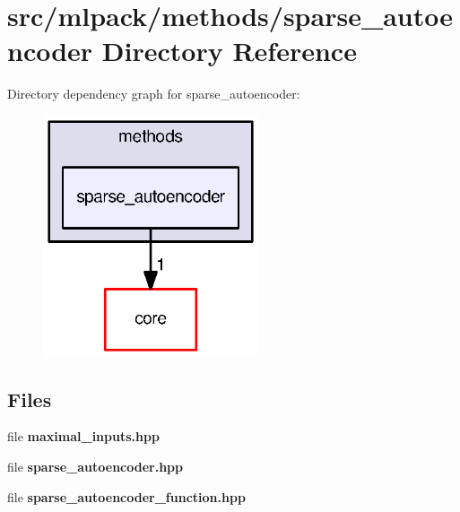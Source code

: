 \section{src/mlpack/methods/sparse\+\_\+autoencoder Directory Reference}
\label{dir_26bd3aa1fbc5e44d8d68d3fa31d9d0ed}
Directory dependency graph for sparse\+\_\+autoencoder\+:
\nopagebreak
\begin{figure}[H]
\begin{center}
\leavevmode
\includegraphics[width=180pt]{dir_26bd3aa1fbc5e44d8d68d3fa31d9d0ed_dep}
\end{center}
\end{figure}
\subsection*{Files}
\begin{DoxyCompactItemize}
\item 
file {\bf maximal\+\_\+inputs.\+hpp}
\item 
file {\bf sparse\+\_\+autoencoder.\+hpp}
\item 
file {\bf sparse\+\_\+autoencoder\+\_\+function.\+hpp}
\end{DoxyCompactItemize}
